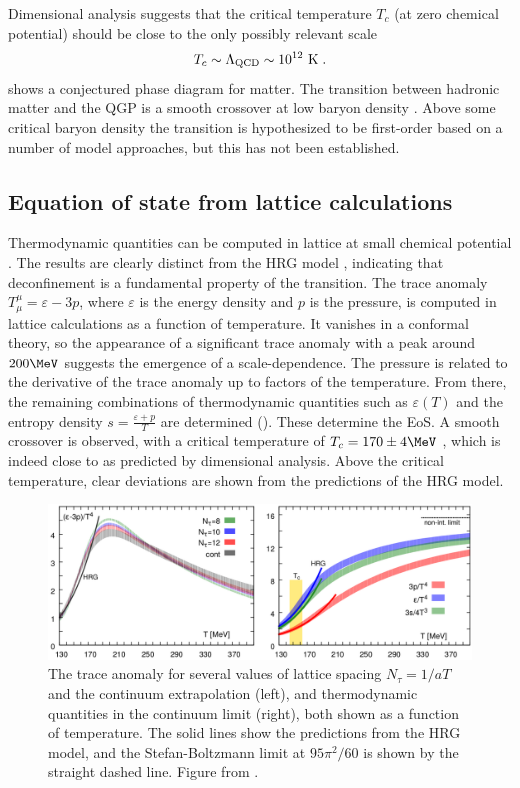 Dimensional analysis suggests that the critical temperature $T_c$ (at zero chemical potential) should be close to the only possibly relevant scale
\[
T_c \sim \Lambda_\textrm{QCD} \sim 10^{12}~\mathrm{K}\; .
\]
 shows a conjectured phase diagram for \qcd matter.
The transition between hadronic matter and the QGP is a smooth crossover at low baryon density \cite{Aoki:2006we}.
Above some critical baryon density the transition is hypothesized to be first-order based on a number of model approaches, but this has not been established.

\subsection{Equation of state from lattice calculations}
\label{subsec:lattice}

Thermodynamic quantities can be computed in lattice \qcd at small chemical potential \cite{Borsanyi:2013bia,Bazavov:2014pvz}.
The results are clearly distinct from the \ac{HRG} model \cite{Huovinen:2009yb}, indicating that deconfinement is a fundamental property of the transition.
The trace anomaly $T_\mu^\mu = \varepsilon - 3 p$, where $\varepsilon$ is the energy density and $p$ is the pressure, is computed in lattice calculations as a function of temperature.
It vanishes in a conformal theory, so the appearance of a significant trace anomaly with a peak around $200 \MeV$ suggests the emergence of a scale-dependence.
The pressure is related to the derivative of the trace anomaly up to factors of the temperature.
From there, the remaining combinations of thermodynamic quantities such as $\varepsilon(T)$ and the entropy density $s = \frac{\varepsilon + p}{T}$ are determined  ().
These determine the \ac{EoS}.
A smooth crossover is observed, with a critical temperature of \( T_c = 170 \pm 4 \MeV \) \cite{Aoki:2009sc}, which is indeed close to \lqcd as predicted by dimensional analysis.
Above the critical temperature, clear deviations are shown from the predictions of the \ac{HRG} model.

\begin{figure}[t]
  \includegraphics[width=\linewidth]{lattice_eos.png}
  \caption{The trace anomaly for several values of lattice spacing $N_\tau = 1/aT$ and the continuum extrapolation (left), and thermodynamic quantities in the continuum limit (right), both shown as a function of temperature. The solid lines show the predictions from the HRG model, and the Stefan-Boltzmann limit at $95\pi^2/60$ is shown by the straight dashed line. Figure from .}
  \label{fig:lattice_eos}
\end{figure}

